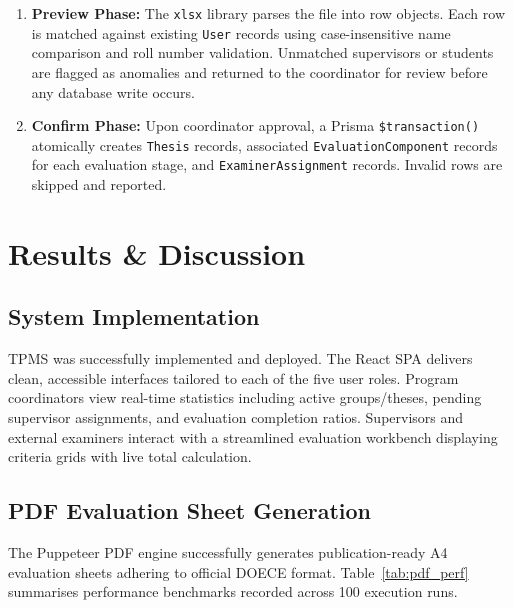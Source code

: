 \documentclass[12pt]{report}
\begin{document}
\begin{enumerate}[leftmargin=1.5cm]
    \item \textbf{Preview Phase:} The \texttt{xlsx} library parses the file into row
          objects. Each row is matched against existing \texttt{User} records using
          case-insensitive name comparison and roll number validation. Unmatched
          supervisors or students are flagged as anomalies and returned to the
          coordinator for review before any database write occurs.
    \item \textbf{Confirm Phase:} Upon coordinator approval, a Prisma
          \texttt{\$transaction()} atomically creates \texttt{Thesis} records,
          associated \texttt{EvaluationComponent} records for each evaluation stage,
          and \texttt{ExaminerAssignment} records. Invalid rows are skipped and
          reported.
\end{enumerate}

\chapter{Results \& Discussion}

\section{System Implementation}
TPMS was successfully implemented and deployed. The React SPA delivers clean,
accessible interfaces tailored to each of the five user roles. Program coordinators
view real-time statistics including active groups/theses, pending supervisor
assignments, and evaluation completion ratios. Supervisors and external examiners
interact with a streamlined evaluation workbench displaying criteria grids with live
total calculation.

\section{PDF Evaluation Sheet Generation}
The Puppeteer PDF engine successfully generates publication-ready A4 evaluation sheets
adhering to official DOECE format. Table~\ref{tab:pdf_perf} summarises performance
benchmarks recorded across 100 execution runs.
\end{document}
